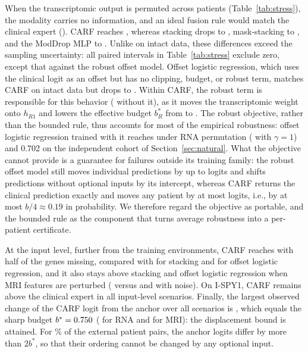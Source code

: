 \documentclass[runningheads]{llncs}
\begin{document}
When the transcriptomic output is permuted across patients (Table~\ref{tab:stress}), the modality carries no information, and an ideal fusion rule would match the clinical expert (\ExtClin{}). CARF reaches \RnaPermCarf{}, whereas stacking drops to \RnaPermStack{}, mask-stacking to \RnaPermMaskStack{}, and the ModDrop MLP to \RnaPermModDrop{}. Unlike on intact data, these differences exceed the sampling uncertainty: all paired intervals in Table~\ref{tab:stress} exclude zero, except that against the robust offset model. Offset logistic regression, which uses the clinical logit as an offset but has no clipping, budget, or robust term, matches CARF on intact data but drops to \RnaPermOffset{}. Within CARF, the robust term is responsible for this behavior (\RnaPermNoRobust{} without it), as it moves the transcriptomic weight onto $h_{R1}$ and lowers the effective budget $b^*_R$ from \SharpBudgetRnaNoRobust{} to \SharpBudgetRna{}. The robust objective, rather than the bounded rule, thus accounts for most of the empirical robustness: offset logistic regression trained with it reaches \RnaPermRobOffset{} under RNA permutation (\RnaPermRobOffsetGOne{} with $\gamma=1$) and 0.702 on the independent cohort of Section~\ref{sec:natural}. What the objective cannot provide is a guarantee for failures outside its training family: the robust offset model still moves individual predictions by up to \MaxDispRobOffsetAll{} logits and shifts predictions without optional inputs by its intercept, whereas CARF returns the clinical prediction exactly and moves any patient by at most \MaxDispCarfAll{} logits, i.e., by at most $b/4\approx0.19$ in probability. We therefore regard the objective as portable, and the bounded rule as the component that turns average robustness into a per-patient certificate.

At the input level, further from the training environments, CARF reaches \GeneDropFiftyCarf{} with half of the genes missing, compared with \GeneDropFiftyStack{} for stacking and \GeneDropFiftyOffset{} for offset logistic regression, and it also stays above stacking and offset logistic regression when MRI features are perturbed (\MriInNoiseCarf{} versus \MriInNoiseStack{} and \MriInNoiseOffset{} with noise). On I-SPY1, CARF remains above the clinical expert in all input-level scenarios. Finally, the largest observed change of the CARF logit from the anchor over all scenarios is \MaxDispCarfAll{}, which equals the sharp budget $b^*=0.750{}$ (\SharpBudgetRna{} for RNA and \SharpBudgetMri{} for MRI): the displacement bound is attained. For \CertifiedPairsSharp\% of the external patient pairs, the anchor logits differ by more than $2b^*$, so that their ordering cannot be changed by any optional input.
\end{document}
